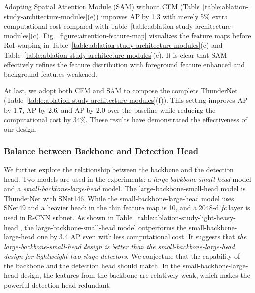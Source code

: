 \documentclass[10pt,twocolumn,letterpaper]{article}
\begin{document}
Adopting Spatial Attention Module (SAM) without CEM (Table~\ref{table:ablation-study-architecture-modules}(e)) improves AP by 1.3 with merely 5\% extra computational cost compared with Table~\ref{table:ablation-study-architecture-modules}(c).
Fig.~\ref{figure:attention-feature-map} visualizes the feature maps before RoI warping in Table~\ref{table:ablation-study-architecture-modules}(c) and Table~\ref{table:ablation-study-architecture-modules}(e).
It is clear that SAM effectively refines the feature distribution with foreground feature enhanced and background features weakened.






At last, we adopt both CEM and SAM to compose the complete ThunderNet (Table~\ref{table:ablation-study-architecture-modules}(f)).
This setting improves AP by 1.7, AP by 2.6, and AP by 2.0 over the baseline while reducing the computational cost by 34\%.
These results have demonstrated the effectiveness of our design.





\vspace{-5pt}
\subsubsection{Balance between Backbone and Detection Head}
\label{section:large-backbone-or-heavy-head}

We further explore the relationship between the backbone and the detection head.
Two models are used in the experiments: a \emph{large-backbone-small-head} model and a \emph{small-backbone-large-head} model.
The large-backbone-small-head model is ThunderNet with SNet146.
While the small-backbone-large-head model uses SNet49 and a heavier head:  in the thin feature map is 10, and a 2048-d \emph{fc} layer is used in R-CNN subnet.
As shown in Table~\ref{table:ablation-study-light-heavy-head}, the large-backbone-small-head model outperforms the small-backbone-large-head one by 3.4 AP even with less computational cost.
It suggests that \emph{the large-backbone-small-head design is better than the small-backbone-large-head design for lightweight two-stage detectors}.
We conjecture that the capability of the backbone and the detection head should match.
In the small-backbone-large-head design, the features from the backbone are relatively weak, which makes the powerful detection head redundant.
\end{document}
